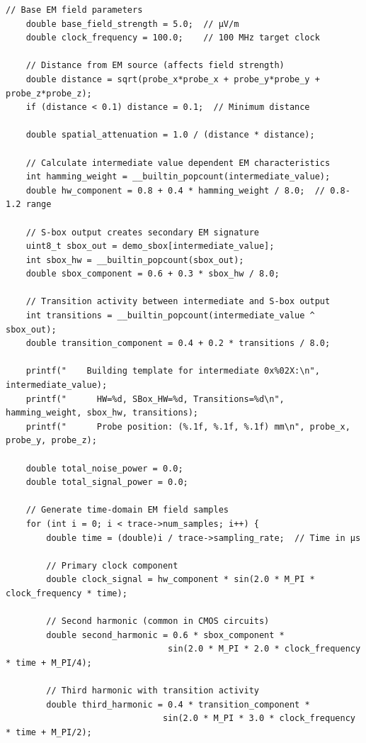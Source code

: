 \documentclass[11pt,a4paper]{article}
\theoremstyle{definition}
\begin{document}
\begin{lstlisting}[caption={Complete EM Template Building Implementation}]
    // Base EM field parameters
    double base_field_strength = 5.0;  // μV/m
    double clock_frequency = 100.0;    // 100 MHz target clock
    
    // Distance from EM source (affects field strength)
    double distance = sqrt(probe_x*probe_x + probe_y*probe_y + probe_z*probe_z);
    if (distance < 0.1) distance = 0.1;  // Minimum distance
    
    double spatial_attenuation = 1.0 / (distance * distance);
    
    // Calculate intermediate value dependent EM characteristics
    int hamming_weight = __builtin_popcount(intermediate_value);
    double hw_component = 0.8 + 0.4 * hamming_weight / 8.0;  // 0.8-1.2 range
    
    // S-box output creates secondary EM signature
    uint8_t sbox_out = demo_sbox[intermediate_value];
    int sbox_hw = __builtin_popcount(sbox_out);
    double sbox_component = 0.6 + 0.3 * sbox_hw / 8.0;
    
    // Transition activity between intermediate and S-box output
    int transitions = __builtin_popcount(intermediate_value ^ sbox_out);
    double transition_component = 0.4 + 0.2 * transitions / 8.0;
    
    printf("    Building template for intermediate 0x%02X:\n", intermediate_value);
    printf("      HW=%d, SBox_HW=%d, Transitions=%d\n", hamming_weight, sbox_hw, transitions);
    printf("      Probe position: (%.1f, %.1f, %.1f) mm\n", probe_x, probe_y, probe_z);
    
    double total_noise_power = 0.0;
    double total_signal_power = 0.0;
    
    // Generate time-domain EM field samples
    for (int i = 0; i < trace->num_samples; i++) {
        double time = (double)i / trace->sampling_rate;  // Time in μs
        
        // Primary clock component
        double clock_signal = hw_component * sin(2.0 * M_PI * clock_frequency * time);
        
        // Second harmonic (common in CMOS circuits)
        double second_harmonic = 0.6 * sbox_component * 
                                sin(2.0 * M_PI * 2.0 * clock_frequency * time + M_PI/4);
        
        // Third harmonic with transition activity
        double third_harmonic = 0.4 * transition_component * 
                               sin(2.0 * M_PI * 3.0 * clock_frequency * time + M_PI/2);
        

\end{lstlisting}
\end{document}
